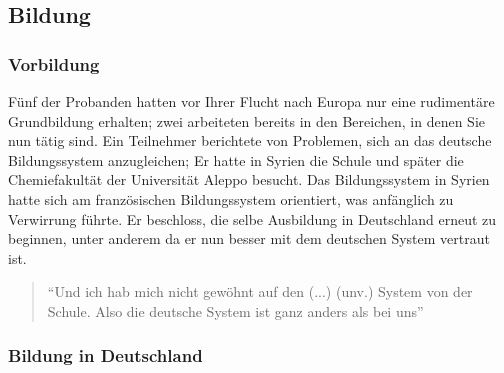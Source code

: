 \subsection{Bildung}


\subsubsection{Vorbildung}
Fünf der Probanden hatten vor Ihrer Flucht nach Europa nur eine rudimentäre Grundbildung erhalten; zwei arbeiteten bereits in den Bereichen, in denen Sie nun tätig sind.\newline
Ein Teilnehmer berichtete von Problemen, sich an das deutsche Bildungssystem anzugleichen; Er hatte in Syrien die Schule und später die Chemiefakultät der Universität Aleppo besucht. Das Bildungssystem in Syrien hatte sich am französischen Bildungssystem orientiert, was anfänglich zu Verwirrung führte.
Er beschloss, die selbe Ausbildung in Deutschland erneut zu beginnen, unter anderem da er nun besser mit dem deutschen System vertraut ist.

\begin{quote}
    ``Und ich hab mich nicht gewöhnt auf den (...) (unv.) System von der Schule. Also die deutsche System ist ganz anders als bei uns''
\end{quote}

\subsubsection{Bildung in Deutschland}

